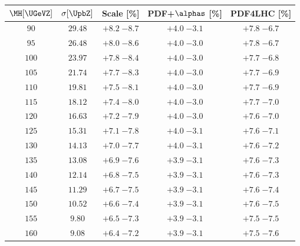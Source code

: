 
\begin{table}
   \begin{center}
   \small
   \begin{tabular}{ccccc}
   \hline
   $\MH[\UGeVZ]$ & $\sigma[\UpbZ]$ & Scale [\%] & PDF+$\alphas$ [\%] & \small{PDF4LHC} [\%]\\
   \hline
$  90  $&$ 29.48 $& ${+ 8.2}   \;{- 8.7} $ & $ {+ 4.0}  \;{- 3.1} $ & ${+ 7.8}   \;{- 6.7} $ \\
$  95  $&$ 26.48 $& ${+ 8.0}   \;{- 8.6} $ & $ {+ 4.0}  \;{- 3.0} $ & ${+ 7.8}   \;{- 6.7} $ \\
$ 100  $&$ 23.97 $& ${+ 7.8}   \;{- 8.4} $ & $ {+ 4.0}  \;{- 3.0} $ & ${+ 7.7}   \;{- 6.8} $ \\
$ 105  $&$ 21.74 $& ${+ 7.7}   \;{- 8.3} $ & $ {+ 4.0}  \;{- 3.0} $ & ${+ 7.7}   \;{- 6.9} $ \\
$ 110  $&$ 19.81 $& $ {+ 7.5}  \;{- 8.1} $ & $ {+ 4.0}  \;{- 3.0} $ & $ {+ 7.7}  \;{- 6.9} $ \\
$ 115  $&$ 18.12 $& $ {+ 7.4}  \;{- 8.0} $ & $ {+ 4.0}  \;{- 3.0} $ & $ {+ 7.7}  \;{- 7.0} $ \\
$ 120  $&$ 16.63 $& $ {+ 7.2}  \;{- 7.9} $ & $ {+ 4.0}  \;{- 3.0} $ & $ {+ 7.6}  \;{- 7.0} $ \\
$ 125  $&$ 15.31 $& $ {+ 7.1}  \;{- 7.8} $ & $ {+ 4.0}  \;{- 3.1} $ & $ {+ 7.6}  \;{- 7.1} $ \\
$ 130  $&$ 14.13 $& $ {+ 7.0}  \;{- 7.7} $ & $ {+ 4.0}  \;{- 3.1} $ & $ {+ 7.6}  \;{- 7.2} $ \\
$ 135  $&$ 13.08 $& $ {+ 6.9}  \;{- 7.6} $ & $ {+ 3.9}  \;{- 3.1} $ & $ {+ 7.6}  \;{- 7.3} $ \\
$ 140  $&$ 12.14 $& $ {+ 6.8}  \;{- 7.5} $ & $ {+ 3.9}  \;{- 3.1} $ & $ {+ 7.6}  \;{- 7.3} $ \\
$ 145  $&$ 11.29 $& $ {+ 6.7}  \;{- 7.5} $ & $ {+ 3.9}  \;{- 3.1} $ & $ {+ 7.6}  \;{- 7.4} $ \\
$ 150  $&$ 10.52 $& $ {+ 6.6}  \;{- 7.4} $ & $ {+ 3.9}  \;{- 3.1} $ & $ {+ 7.6}  \;{- 7.5} $ \\
$ 155  $&$  9.80 $& $ {+ 6.5}  \;{- 7.3} $ & $ {+ 3.9}  \;{- 3.1} $ & $ {+ 7.5}  \;{- 7.5} $ \\
$ 160  $&$  9.08 $& $ {+ 6.4}  \;{- 7.2} $ & $ {+ 3.9}  \;{- 3.1} $ & $ {+ 7.5}  \;{- 7.6} $ \\

\end{tabular}
\end{center}
\end{table}
